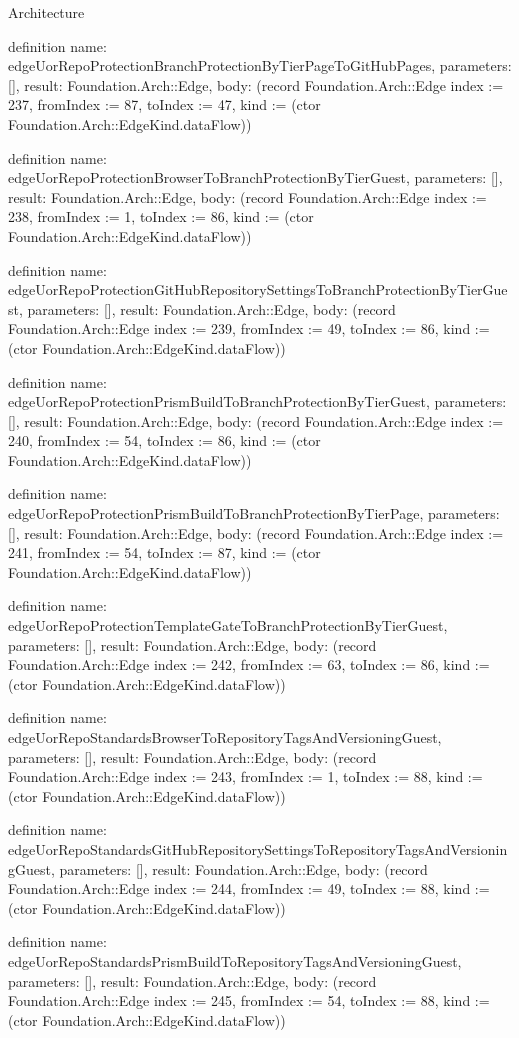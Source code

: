 \begin{lexlean}{Architecture}
\begin{semanticmodule}
definition{
  name: edgeUorRepoProtectionBranchProtectionByTierPageToGitHubPages,
  parameters: [],
  result: Foundation.Arch::Edge,
  body: (record Foundation.Arch::Edge {index := 237, fromIndex := 87, toIndex := 47, kind := (ctor Foundation.Arch::EdgeKind.dataFlow)})
}

definition{
  name: edgeUorRepoProtectionBrowserToBranchProtectionByTierGuest,
  parameters: [],
  result: Foundation.Arch::Edge,
  body: (record Foundation.Arch::Edge {index := 238, fromIndex := 1, toIndex := 86, kind := (ctor Foundation.Arch::EdgeKind.dataFlow)})
}

definition{
  name: edgeUorRepoProtectionGitHubRepositorySettingsToBranchProtectionByTierGuest,
  parameters: [],
  result: Foundation.Arch::Edge,
  body: (record Foundation.Arch::Edge {index := 239, fromIndex := 49, toIndex := 86, kind := (ctor Foundation.Arch::EdgeKind.dataFlow)})
}

definition{
  name: edgeUorRepoProtectionPrismBuildToBranchProtectionByTierGuest,
  parameters: [],
  result: Foundation.Arch::Edge,
  body: (record Foundation.Arch::Edge {index := 240, fromIndex := 54, toIndex := 86, kind := (ctor Foundation.Arch::EdgeKind.dataFlow)})
}

definition{
  name: edgeUorRepoProtectionPrismBuildToBranchProtectionByTierPage,
  parameters: [],
  result: Foundation.Arch::Edge,
  body: (record Foundation.Arch::Edge {index := 241, fromIndex := 54, toIndex := 87, kind := (ctor Foundation.Arch::EdgeKind.dataFlow)})
}

definition{
  name: edgeUorRepoProtectionTemplateGateToBranchProtectionByTierGuest,
  parameters: [],
  result: Foundation.Arch::Edge,
  body: (record Foundation.Arch::Edge {index := 242, fromIndex := 63, toIndex := 86, kind := (ctor Foundation.Arch::EdgeKind.dataFlow)})
}

definition{
  name: edgeUorRepoStandardsBrowserToRepositoryTagsAndVersioningGuest,
  parameters: [],
  result: Foundation.Arch::Edge,
  body: (record Foundation.Arch::Edge {index := 243, fromIndex := 1, toIndex := 88, kind := (ctor Foundation.Arch::EdgeKind.dataFlow)})
}

definition{
  name: edgeUorRepoStandardsGitHubRepositorySettingsToRepositoryTagsAndVersioningGuest,
  parameters: [],
  result: Foundation.Arch::Edge,
  body: (record Foundation.Arch::Edge {index := 244, fromIndex := 49, toIndex := 88, kind := (ctor Foundation.Arch::EdgeKind.dataFlow)})
}

definition{
  name: edgeUorRepoStandardsPrismBuildToRepositoryTagsAndVersioningGuest,
  parameters: [],
  result: Foundation.Arch::Edge,
  body: (record Foundation.Arch::Edge {index := 245, fromIndex := 54, toIndex := 88, kind := (ctor Foundation.Arch::EdgeKind.dataFlow)})
}


\end{semanticmodule}
\end{lexlean}
